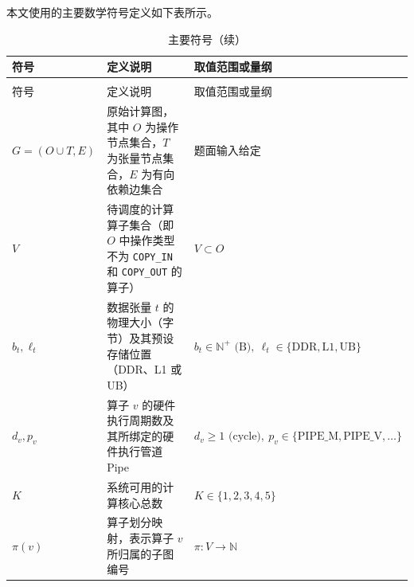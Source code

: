 \documentclass[anonymous,withtoc]{gmcm2026}
\begin{document}
本文使用的主要数学符号定义如下表所示。

{\def\LTcaptype{table} %
\begin{longtable}[]{@{}
  >{\raggedright\arraybackslash}p{}
  >{\raggedright\arraybackslash}p{}
  >{\raggedright\arraybackslash}p{}@{}}
\caption{主要符号}\label{tab:02-assumptions-1}\\
\toprule\noalign{}
\begin{minipage}[b]{\linewidth}\raggedright
符号
\end{minipage} & \begin{minipage}[b]{\linewidth}\raggedright
定义说明
\end{minipage} & \begin{minipage}[b]{\linewidth}\raggedright
取值范围或量纲
\end{minipage} \\
\midrule\noalign{}
\endfirsthead
\caption[]{主要符号（续）}\\
\toprule\noalign{}
\begin{minipage}[b]{\linewidth}\raggedright
符号
\end{minipage} & \begin{minipage}[b]{\linewidth}\raggedright
定义说明
\end{minipage} & \begin{minipage}[b]{\linewidth}\raggedright
取值范围或量纲
\end{minipage} \\
\midrule\noalign{}
\endhead
\bottomrule\noalign{}
\endlastfoot
\(G=(O\cup T, E)\) & 原始计算图，其中 \(O\) 为操作节点集合，\(T\) 为张量节点集合，\(E\) 为有向依赖边集合 & 题面输入给定 \\
\(V\) & 待调度的计算算子集合（即 \(O\) 中操作类型不为 \texttt{COPY\_IN} 和 \texttt{COPY\_OUT} 的算子） & \(V \subset O\) \\
\(b_t, \ell_t\) & 数据张量 \(t\) 的物理大小（字节）及其预设存储位置（DDR、L1 或 UB） & \(b_t \in \mathbb{N}^+ \text{ (B)},\ \ell_t \in \{\text{DDR}, \text{L1}, \text{UB}\}\) \\
\(d_v, p_v\) & 算子 \(v\) 的硬件执行周期数及其所绑定的硬件执行管道 Pipe & \(d_v \ge 1 \text{ (cycle)},\ p_v \in \{\text{PIPE\_M}, \text{PIPE\_V}, \dots\}\) \\
\(K\) & 系统可用的计算核心总数 & \(K \in \{1, 2, 3, 4, 5\}\) \\
\(\pi(v)\) & 算子划分映射，表示算子 \(v\) 所归属的子图编号 & \(\pi: V \to \mathbb{N}\) \\

\end{longtable}}
\end{document}
